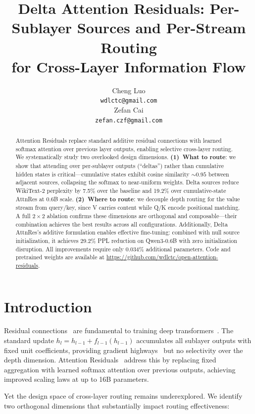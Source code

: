 \documentclass{article}
\title{Delta Attention Residuals: Per-Sublayer Sources and Per-Stream Routing\\ for Cross-Layer Information Flow}
\author{
  Cheng Luo \\
  \texttt{wdlctc@gmail.com} \\
  \And
  Zefan Cai \\
  \texttt{zefan.czf@gmail.com} \\
}
\begin{document}
\maketitle

\begin{abstract}
Attention Residuals replace standard additive residual connections with learned softmax attention over previous layer outputs, enabling selective cross-layer routing. We systematically study two overlooked design dimensions. \textbf{(1)~What to route}: we show that attending over per-sublayer outputs (``deltas'') rather than cumulative hidden states is critical---cumulative states exhibit cosine similarity ${\sim}0.95$ between adjacent sources, collapsing the softmax to near-uniform weights. Delta sources reduce WikiText-2 perplexity by 7.5\% over the baseline and 19.2\% over cumulative-state AttnRes at 0.6B scale. \textbf{(2)~Where to route}: we decouple depth routing for the value stream from query/key, since V carries content while Q/K encode positional matching. A full $2{\times}2$ ablation confirms these dimensions are orthogonal and composable---their combination achieves the best results across all configurations. Additionally, Delta AttnRes's additive formulation enables effective fine-tuning: combined with null source initialization, it achieves 29.2\% PPL reduction on Qwen3-0.6B with zero initialization disruption. All improvements require only 0.034\% additional parameters. Code and pretrained weights are available at \url{https://github.com/wdlctc/open-attention-residuals}.
\end{abstract}

\section{Introduction}

Residual connections~\citep{he2016deep} are fundamental to training deep transformers~\citep{vaswani2017attention}. The standard update $h_l = h_{l-1} + f_{l-1}(h_{l-1})$ accumulates all sublayer outputs with fixed unit coefficients, providing gradient highways~\citep{veit2016residual} but no selectivity over the depth dimension. Attention Residuals~\citep{kimi2025attention} address this by replacing fixed aggregation with learned softmax attention over previous outputs, achieving improved scaling laws at up to 16B parameters.

Yet the design space of cross-layer routing remains underexplored. We identify two orthogonal dimensions that substantially impact routing effectiveness:
\end{document}
